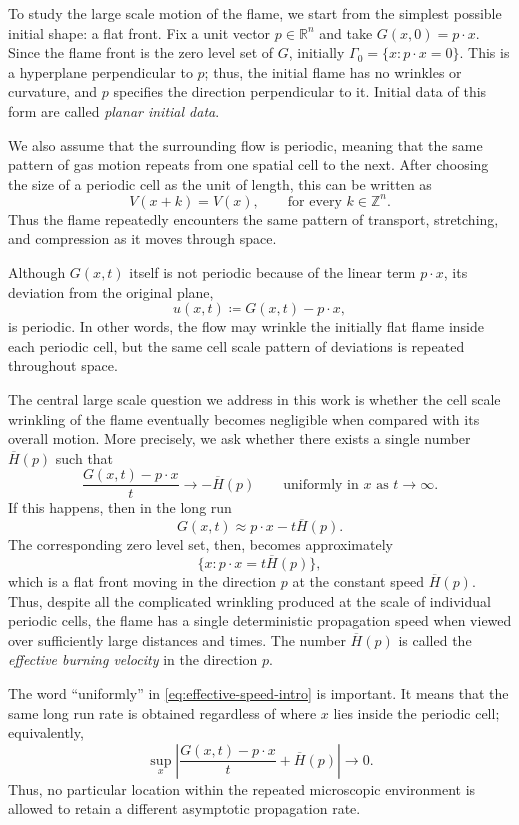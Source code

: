 \documentclass[11pt,reqno,noamsfonts]{amsart}
\theoremstyle{definition}
\theoremstyle{remark}
\begin{document}
To study the large scale motion of the flame, we start from the simplest
possible initial shape: a flat front. Fix a unit vector
$p\in\mathbb R^n$ and take
  $G(x,0)=p\cdot x$.
Since the flame front is the zero level set of $G$, initially
  $\Gamma_0=\{x:p\cdot x=0\}$.
This is a hyperplane perpendicular to $p$;
thus, the initial flame has
no wrinkles or curvature, and $p$ specifies the direction perpendicular
to it. Initial data of this form are called \emph{planar initial data}.

We also assume that the surrounding flow is periodic, meaning that the
same pattern of gas motion repeats from one spatial cell to the next.
After choosing the size of a periodic cell as the unit of length, this
can be written as
\[
  V(x+k)=V(x),
  \qquad\text{for every }k\in\mathbb Z^n.
\]
Thus the flame repeatedly encounters the same pattern of transport,
stretching, and compression as it moves through space.

Although $G(x,t)$ itself is not periodic because of the linear term
$p\cdot x$, its deviation from the original plane,
\[
  u(x,t)\coloneqq G(x,t)-p\cdot x,
\]
is periodic. In other words, the flow may wrinkle the initially flat
flame inside each periodic cell, but the same cell scale pattern of
deviations is repeated throughout space.

The central large scale question we address in this work is whether the cell scale wrinkling of
the flame eventually becomes negligible when compared with its overall
motion. More precisely, we ask whether there exists a single number
$\overline H(p)$ such that
\begin{equation}\label{eq:effective-speed-intro}
  \frac{G(x,t)-p\cdot x}{t}
  \longrightarrow -\overline H(p)
  \qquad\text{uniformly in }x
  \text{ as }t\to\infty.
\end{equation}
If this happens, then in the long run
\[
  G(x,t)\approx p\cdot x-t \overline H(p).
\]
The corresponding zero level set, then, becomes approximately
\[
  \{x:p\cdot x=t \overline H(p)\},
\]
which is a flat front moving in the direction $p$ at the constant speed
$\overline H(p)$. Thus, despite all the complicated wrinkling produced
at the scale of individual periodic cells, the flame has a single
deterministic propagation speed when viewed over sufficiently large
distances and times. The number $\overline H(p)$ is called the
\emph{effective burning velocity} in the direction $p$.

The word ``uniformly'' in \eqref{eq:effective-speed-intro} is important.
It means that the same long run rate is obtained regardless of where
$x$ lies inside the periodic cell; equivalently,
\[
  \sup_x
  \left|
    \frac{G(x,t)-p\cdot x}{t}
    +\overline H(p)
  \right|
  \longrightarrow0.
\]
Thus, no particular location within the repeated microscopic environment
is allowed to retain a different asymptotic propagation rate.
\end{document}
